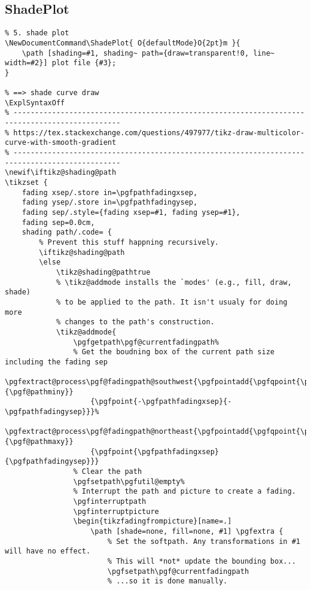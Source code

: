 \subsection{ShadePlot}
\begin{verbatim}
% 5. shade plot
\NewDocumentCommand\ShadePlot{ O{defaultMode}O{2pt}m }{
    \path [shading=#1, shading~ path={draw=transparent!0, line~ width=#2}] plot file {#3};
}

% ==> shade curve draw
\ExplSyntaxOff
% -----------------------------------------------------------------------------------------------
% https://tex.stackexchange.com/questions/497977/tikz-draw-multicolor-curve-with-smooth-gradient
% -----------------------------------------------------------------------------------------------
\newif\iftikz@shading@path
\tikzset {
    fading xsep/.store in=\pgfpathfadingxsep,
    fading ysep/.store in=\pgfpathfadingysep,
    fading sep/.style={fading xsep=#1, fading ysep=#1},
    fading sep=0.0cm,
    shading path/.code= {
        % Prevent this stuff happning recursively.
        \iftikz@shading@path
        \else
            \tikz@shading@pathtrue
            % \tikz@addmode installs the `modes' (e.g., fill, draw, shade) 
            % to be applied to the path. It isn't usualy for doing more
            % changes to the path's construction.
            \tikz@addmode{
                \pgfgetpath\pgf@currentfadingpath%
                % Get the boudning box of the current path size including the fading sep
                \pgfextract@process\pgf@fadingpath@southwest{\pgfpointadd{\pgfqpoint{\pgf@pathminx}{\pgf@pathminy}}
                    {\pgfpoint{-\pgfpathfadingxsep}{-\pgfpathfadingysep}}}%
                \pgfextract@process\pgf@fadingpath@northeast{\pgfpointadd{\pgfqpoint{\pgf@pathmaxx}{\pgf@pathmaxy}}
                    {\pgfpoint{\pgfpathfadingxsep}{\pgfpathfadingysep}}}
                % Clear the path
                \pgfsetpath\pgfutil@empty%                         
                % Interrupt the path and picture to create a fading.
                \pgfinterruptpath
                \pgfinterruptpicture
                \begin{tikzfadingfrompicture}[name=.]
                    \path [shade=none, fill=none, #1] \pgfextra {
                        % Set the softpath. Any transformations in #1 will have no effect.
                        % This will *not* update the bounding box...
                        \pgfsetpath\pgf@currentfadingpath
                        % ...so it is done manually.

\end{verbatim}
